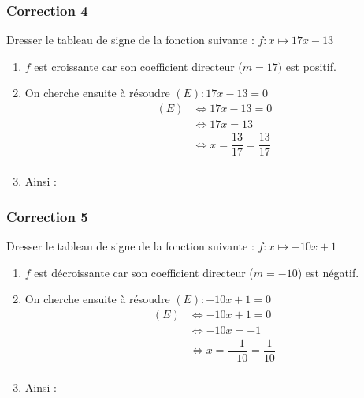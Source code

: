 \documentclass[15pt, mathserif]{beamer}
\begin{document}
\begin{frame}
\vspace{-10mm}
	\frametitle{Correction 4}
\vspace*{1cm} 
 \footnotesize{Dresser le tableau de signe de la fonction suivante : $ f:x\mapsto17x-13$} 
 \begin{enumerate} 
 \item $f$ est croissante car son coefficient directeur ($m=17)$ est positif.
 \item On cherche ensuite à résoudre  $(E) : 17x-13=0 $	 
 \begin{align*} (E)& \Leftrightarrow 17x-13=0\\
		 	 & \Leftrightarrow 17x=13\\
			 & \Leftrightarrow x= \dfrac{13}{17}=\dfrac{13}{17}\\
	 \end{align*} 
 \item Ainsi : \\ 
 \end{enumerate} 
 \end{frame}


\begin{frame}
\vspace{-10mm}
	\frametitle{Correction 5}
\vspace*{1cm} 
 \footnotesize{Dresser le tableau de signe de la fonction suivante : $ f:x\mapsto-10x+1$} 
 \begin{enumerate} 
 \item $f$ est décroissante car son coefficient directeur ($m=-10$) est négatif.
 \item On cherche ensuite à résoudre  $(E) : -10x+1=0 $	 
 \begin{align*} (E)& \Leftrightarrow -10x+1=0\\
		 	 & \Leftrightarrow -10x=-1\\
			 & \Leftrightarrow x= \dfrac{-1}{-10}=\dfrac{1}{10}\\
	 \end{align*} 
 \item Ainsi : \\ 
 \end{enumerate} 
 \end{frame}
\end{document}
